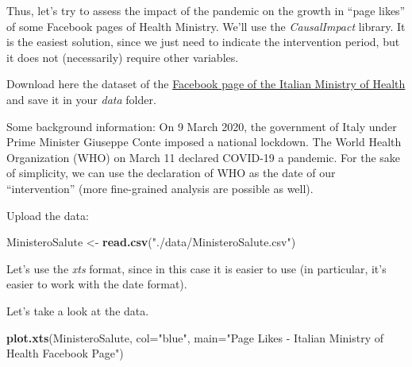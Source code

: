 \documentclass[
]{article}
\newenvironment{Shaded}{\begin{snugshade}}{\end{snugshade}}
\newcommand{\CommentTok}[1]{\textcolor[rgb]{0.56,0.35,0.01}{\textit{#1}}}
\newcommand{\DataTypeTok}[1]{\textcolor[rgb]{0.13,0.29,0.53}{#1}}
\newcommand{\KeywordTok}[1]{\textcolor[rgb]{0.13,0.29,0.53}{\textbf{#1}}}
\newcommand{\NormalTok}[1]{#1}
\newcommand{\OperatorTok}[1]{\textcolor[rgb]{0.81,0.36,0.00}{\textbf{#1}}}
\newcommand{\StringTok}[1]{\textcolor[rgb]{0.31,0.60,0.02}{#1}}
\begin{document}
Thus, let's try to assess the impact of the pandemic on the growth in ``page likes'' of some Facebook pages of Health Ministry. We'll use the \emph{CausalImpact} library. It is the easiest solution, since we just need to indicate the intervention period, but it does not (necessarily) require other variables.

Download here the dataset of the \href{https://drive.google.com/file/d/1t4ncdNlanQwZwBvWx9AQe6R2dp-7Faew/view?usp=sharing}{Facebook page of the Italian Ministry of Health} and save it in your \emph{data} folder.

Some background information: On 9 March 2020, the government of Italy under Prime Minister Giuseppe Conte imposed a national lockdown. The World Health Organization (WHO) on March 11 declared COVID-19 a pandemic. For the sake of simplicity, we can use the declaration of WHO as the date of our ``intervention'' (more fine-grained analysis are possible as well).

Upload the data:

\begin{Shaded}
\begin{Highlighting}[]
\NormalTok{MinisteroSalute <-}\StringTok{ }\KeywordTok{read.csv}\NormalTok{(}\StringTok{"./data/MinisteroSalute.csv"}\NormalTok{)}
\end{Highlighting}
\end{Shaded}

Let's use the \emph{xts} format, since in this case it is easier to use (in particular, it's easier to work with the date format).

\begin{Shaded}
\end{Shaded}

Let's take a look at the data.

\begin{Shaded}
\begin{Highlighting}[]
\KeywordTok{plot.xts}\NormalTok{(MinisteroSalute, }\DataTypeTok{col=}\StringTok{"blue"}\NormalTok{,}
         \DataTypeTok{main=}\StringTok{"Page Likes - Italian Ministry of Health Facebook Page"}\NormalTok{)}
\end{Highlighting}
\end{Shaded}
\end{document}
